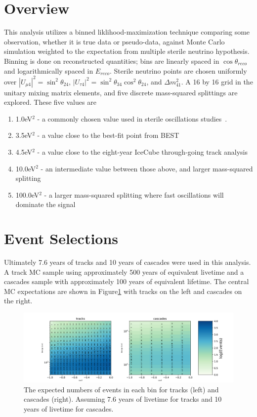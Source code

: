 \documentclass[main.tex]{subfiles}
\begin{document}
\section{Overview}

This analysis utilizes a binned liklihood-maximization technique comparing some observation, whether it is true data or pseudo-data, against Monte Carlo simulation weighted to the expectation from multiple sterile neutrino hypothesis. 
Binning is done on reconstructed quantities; bins are linearly spaced in $\cos\theta_{reco}$ and logarithmically spaced in $E_{reco}$. 
Sterile neutrino points are chosen uniformly over $\left|U_{\mu 4}\right|^{2}=\sin^{2}\theta_{24}$, $\left|U_{\tau 4}\right|^{2}=\sin^{2}\theta_{34}\cos^{2}\theta_{24}$, and $\Delta m_{41}^{2}$. 
A 16 by 16 grid in the unitary mixing matrix elements, and five discrete mass-squared splittings are explored. 
These five values are 
\begin{enumerate}
    \item 1.0eV$^{2}$ - a commonly chosen value used in sterile oscillations studies~\cite{Aartsen_2017_dc, PhysRevD.91.052019, PhysRevD.105.052001}. 
    \item 3.5eV$^{2}$ - a value close to the best-fit point from BEST~\cite{barinov2021results}
    \item 4.5eV$^{2}$ - a value close to the eight-year IceCube through-going track analysis~\cite{Aartsen_2020, Aartsen_2020_prd}
    \item 10.0eV$^{2}$ - an intermediate value between those above, and larger mass-squared splitting
    \item 100.0eV$^{2}$ - a larger mass-squared splitting where fast oscillations will dominate the signal
\end{enumerate}

\section{Event Selections}

Ultimately 7.6 years of tracks and 10 years of cascades were used in this analysis. 
A track MC sample using approximately 500 years of equivalent livetime and a cascades sample with approximately 100 years of equivalent lifetime. 
The central MC expectations are shown in Figure\ref{fig:event_no} with tracks on the left and cascades on the right. 

\begin{figure}
    \centering
    \includegraphics[width=0.8\linewidth]{figures/realization_joint.png}
    \caption{The expected numbers of events in each bin for tracks (left) and cascades (right). Assuming 7.6 years of livetime for tracks and 10 years of livetime for cascades.}\label{fig:event_no}
\end{figure}
\end{document}
